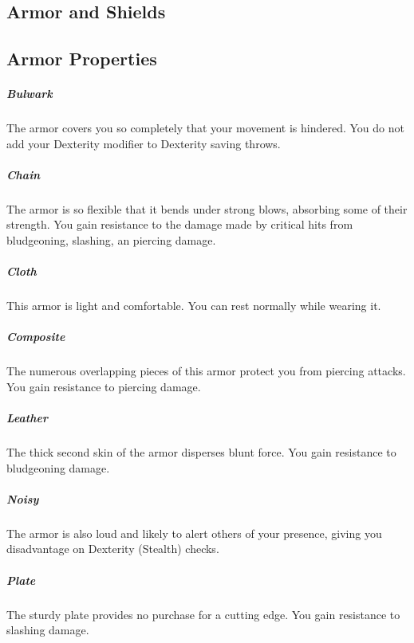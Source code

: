 \subsection*{Armor and Shields} \label{ssec::armorandshields}

\subsection*{Armor Properties} \label{ssec::armorproperties}
    \subparagraph{Bulwark} The armor covers you so completely that your movement is hindered.
    You do not add your Dexterity modifier to Dexterity saving throws.

    \subparagraph{Chain} The armor is so flexible that it bends under strong blows, absorbing some of their strength.
    You gain resistance to the damage made by critical hits from bludgeoning, slashing, an piercing damage.

    \subparagraph{Cloth} This armor is light and comfortable.
    You can rest normally while wearing it.

    \subparagraph{Composite} The numerous overlapping pieces of this armor protect you from piercing attacks.
    You gain resistance to piercing damage.

    \subparagraph{Leather} The thick second skin of the armor disperses blunt force.
    You gain resistance to bludgeoning damage.

    \subparagraph{Noisy} The armor is also loud and likely to alert others of your presence, giving you disadvantage on Dexterity (Stealth) checks.

    \subparagraph{Plate} The sturdy plate provides no purchase for a cutting edge.
    You gain resistance to slashing damage.
